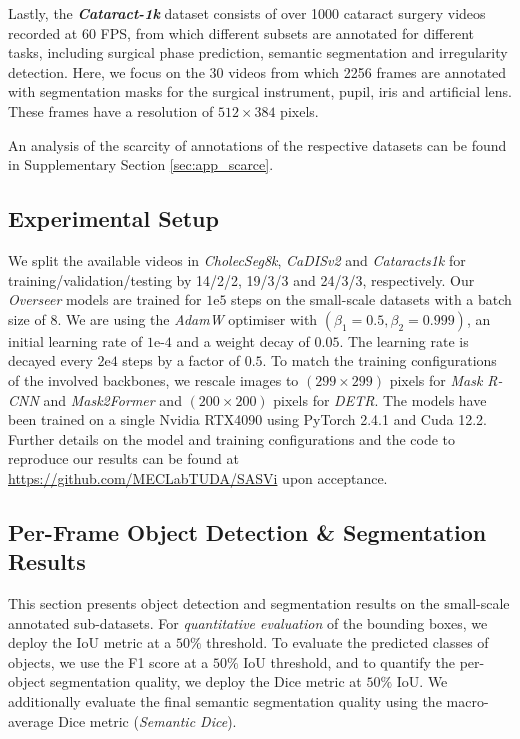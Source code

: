 Lastly, the \textbf{\emph{Cataract-1k}} dataset \cite{ghamsarian2023cataract} consists of over 1000 cataract surgery videos recorded at 60 FPS, from which different subsets are annotated for different tasks, including surgical phase prediction, semantic segmentation and irregularity detection. Here, we focus on the 30 videos from which 2256 frames are annotated with segmentation masks for the surgical instrument, pupil, iris and artificial lens. These frames have a resolution of $512 \times 384$ pixels. 

An analysis of the scarcity of annotations of the respective datasets can be found in Supplementary Section \ref{sec:app_scarce}.


%
%
%

\subsection{Experimental Setup}

We split the available videos in \emph{CholecSeg8k}, \emph{CaDISv2} and \emph{Cataracts1k} for training/validation/testing by 14/2/2, 19/3/3 and 24/3/3, respectively.
Our \emph{Overseer} models are trained for $1\text{e}5$ steps on the small-scale datasets with a batch size of 8. We are using the \emph{AdamW} optimiser \cite{loshchilov2017decoupled} with $(\beta_1=0.5,\beta_2=0.999)$, an initial learning rate of $1\text{e-}4$ and a weight decay of $0.05$. The learning rate is decayed every $2\text{e}4$ steps by a factor of $0.5$. To match the training configurations of the involved backbones, we rescale images to $(299 \times 299)$ pixels for \emph{Mask R-CNN} and \emph{Mask2Former} and $(200 \times 200)$ pixels for \emph{DETR}. The models have been trained on a single Nvidia RTX4090 using PyTorch 2.4.1 and Cuda 12.2.
Further details on the model and training configurations and the code to reproduce our results can be found at \href{https://github.com/MECLabTUDA/SASVi}{https://github.com/MECLabTUDA/SASVi} upon acceptance.

%
%
%

\subsection{Per-Frame Object Detection \& Segmentation Results}
\label{sec:overseer}

This section presents object detection and segmentation results on the small-scale annotated sub-datasets. For \emph{quantitative evaluation} of the bounding boxes, we deploy the IoU metric at a $50\%$ threshold. To evaluate the predicted classes of objects, we use the F1 score at a $50\%$ IoU threshold, and to quantify the per-object segmentation quality, we deploy the Dice metric at $50\%$ IoU. We additionally evaluate the final semantic segmentation quality using the macro-average Dice metric (\emph{Semantic Dice}).

